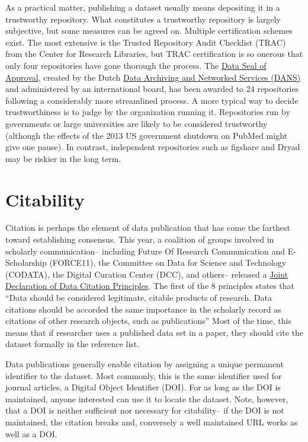 \documentclass[10pt,twocolumn]{article}
\begin{document}
As a practical matter, publishing a dataset usually means depositing it in a trustworthy repository. 
What constitutes a trustworthy repository is largely subjective, but some measures can be agreed on. 
Multiple certification schemes exist.
The most extensive is the Trusted Repository Audit Checklist (TRAC)\cite{dale_trustworthy_2007} from the Center for Research Libraries, but TRAC certification is so onerous that only four repositories have gone thorough the process. 
The \href{http://datasealofapproval.org/}{Data Seal of Approval}, created by the Dutch \href{http://www.dans.knaw.nl/en}{Data Archiving and Networked Services (DANS)} and administered by an international board, has been awarded to 24 repositories following a considerably more streamlined process. %
A more typical way to decide trustworthiness is to judge by the organization running it. 
Repositories run by governments or large universities are likely to be considered trustworthy (although the effects of the 2013 US government shutdown on PubMed might give one pause).
In contrast, independent repositories such as figshare and Dryad may be riskier in the long term. %

\section*{Citability}\label{citability}

Citation is perhaps the element of data publication that has come the farthest toward establishing consensus.  
This year, a coalition of groups involved in scholarly communication– including Future Of Research Communication and E-Scholarship (FORCE11)\cite{bourne_improving_2012}, the Committee on Data for Science and Technology (CODATA)\cite{codata-icsti_task_group_on_data_citation_standards_and_practices_out_2013}, the Digital Curation Center (DCC), and others– released a \href{http://www.force11.org/datacitation}{Joint Declaration of Data Citation Principles}.
The first of the 8 principles states that 
``Data should be considered legitimate, citable products of research. Data citations should be accorded the same importance in the scholarly record as citations of other research objects, such as publications''
Most of the time, this means that if researcher uses a published data set in a paper, they should cite the dataset formally in the reference list. 
	
Data publications generally enable citation by assigning a unique permanent identifier to the dataset.
Most commonly, this is the same identifier used for journal articles, a Digital Object Identifier (DOI).
For as long as the DOI is maintained, anyone interested can use it to locate the dataset. 
Note, however, that a DOI is neither sufficient nor necessary for citability-- if the DOI is not maintained, the citation breaks and, conversely a well maintained URL works as well as a DOI. 
\end{document}
